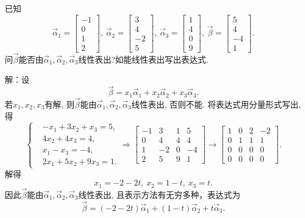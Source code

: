 \begin{eg}
已知
$$\vec{\alpha}_1=\begin{bmatrix}-1\\0\\1\\2\end{bmatrix},\ \vec{\alpha}_2=\begin{bmatrix}3\\4\\-2\\5\end{bmatrix},\
\vec{\alpha}_3=\begin{bmatrix}1\\4\\0\\9\end{bmatrix},\  \vec{\beta}=\begin{bmatrix}5\\4\\-4\\1\end{bmatrix}.$$
问$\vec{\beta}$能否由$\vec{\alpha}_1,\vec{\alpha}_2,\vec{\alpha}_3$线性表出?如能线性表出写出表达式.
\end{eg}
解：设$$\vec{\beta}=x_1\vec{\alpha}_1+x_2\vec{\alpha}_2+x_3\vec{\alpha}_3.$$ 若$x_1, x_2, x_3$有解, 则$\vec{\beta}$能由$\vec{\alpha}_1,\vec{\alpha}_2,\vec{\alpha}_3$线性表出, 否则不能. 将表达式用分量形式写出, 得
\begin{displaymath}\left\{\begin{aligned}
&-x_1+3x_2+x_3=5,\\
&4x_2+4x_3=4,\\
&x_1-x_3=-4,\\
&2x_1+5x_2+9x_3=1.\end{aligned}\right.\Rightarrow\begin{bmatrix}-1&3&1&5\\0&4&4&4
\\ 1&-2&0&-4\\2&5&9&1\end{bmatrix}\rightarrow\begin{bmatrix}1&0&2&-2\\0&1&1&1\\0&0&0&0\\0&0&0&0
\end{bmatrix}.\end{displaymath}
解得$$x_1=-2-2t,\ x_2=1-t,\ x_3=t.$$
因此$\vec{\beta}$能由$\vec{\alpha}_1,\vec{\alpha}_2,\vec{\alpha}_3$线性表出, 且表示方法有无穷多种，表达式为
$$\vec{\beta}=(-2-2t)\vec{\alpha}_1+(1-t)\vec{\alpha}_2+t\vec{\alpha}_3.$$


